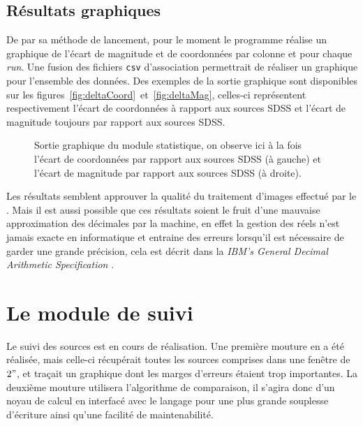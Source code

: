	\subsection{Résultats graphiques}

De par sa méthode de lancement, pour le moment le programme réalise un graphique de l'écart de magnitude et de coordonnées par colonne et pour chaque \emph{run}. Une fusion des fichiers \texttt{csv} d'association permettrait de réaliser un graphique pour l'ensemble des données. Des exemples de la sortie graphique sont disponibles sur les figures~\ref{fig:deltaCoord}~et~\ref{fig:deltaMag}, celles-ci représentent respectivement l'écart de coordonnées à rapport aux sources SDSS et l'écart de magnitude toujours par rapport aux sources SDSS.

	\begin{figure}[h]
	  \centering
	  \hspace{5pt}
	  
	  \caption[Sortie graphique du module statistique]{Sortie graphique du module statistique, on observe ici à la fois l'écart de coordonnées par rapport aux sources SDSS (à gauche) et l'écart de magnitude par rapport aux sources SDSS (à droite).}
	  \label{fig:fv}
	\end{figure}

Les résultats semblent approuver la qualité du traitement d'images effectué par le \stack{}. Mais il est aussi possible que ces résultats soient le fruit d'une mauvaise approximation des décimales par la machine, en effet la gestion des réels n'est jamais exacte en informatique et entraine des erreurs lorsqu'il est nécessaire de garder une grande précision, cela est décrit dans la \emph{IBM’s General Decimal Arithmetic Specification} \cite{IBM}.


\section{Le module de suivi}

Le suivi des sources est en cours de réalisation. Une première mouture en \Python{} a été réalisée, mais celle-ci récupérait toutes les sources comprises dans une fenêtre de $2"$, et traçait un graphique dont les marges d'erreurs étaient trop importantes. La deuxième mouture utilisera l'algorithme de comparaison, il s'agira donc d'un noyau de calcul en \Cpp{} interfacé avec le langage \Python{} pour une plus grande souplesse d'écriture ainsi qu'une facilité de maintenabilité.

